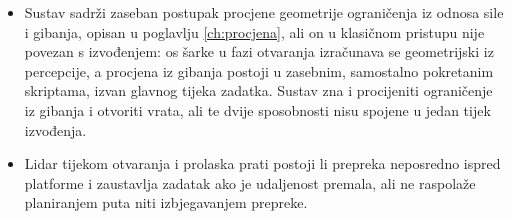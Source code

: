 \begin{itemize}
      \item Sustav sadrži zaseban postupak procjene geometrije ograničenja iz odnosa sile i
            gibanja, opisan u poglavlju \ref{ch:procjena}, ali on u klasičnom pristupu nije
            povezan s izvođenjem: os šarke u fazi otvaranja izračunava se geometrijski iz
            percepcije, a procjena iz gibanja postoji u zasebnim, samostalno pokretanim
            skriptama, izvan glavnog tijeka zadatka. Sustav zna i procijeniti ograničenje iz
            gibanja i otvoriti vrata, ali te dvije sposobnosti nisu spojene u jedan tijek
            izvođenja.

      \item Lidar tijekom otvaranja i prolaska prati postoji li prepreka neposredno ispred
            platforme i zaustavlja zadatak ako je udaljenost premala, ali ne raspolaže
            planiranjem puta niti izbjegavanjem prepreke.
\end{itemize}